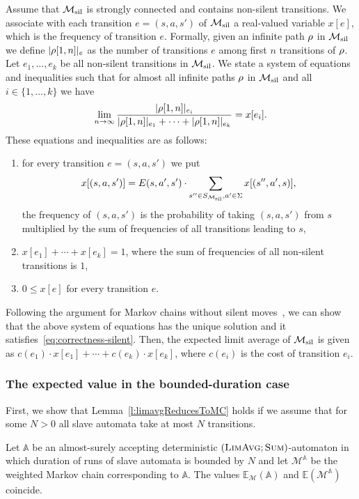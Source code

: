 \documentclass{lmcs}
\newcommand{\nestedA}{\mathbb{A}}
\newcommand{\MCfromNested}{\markov^{\nestedA}}
\newcommand{\fsum}{\textsc{Sum}}
\newcommand{\flimavg}{\textsc{LimAvg}}
\newcommand{\expected}{\mathbb{E}}
\newcommand{\markov}{\mathcal{M}}
\begin{document}
Assume that  $\silentMarkov$ is strongly connected and contains non-silent transitions.
We associate with each transition $e = (s,a,s')$ of $\silentMarkov$ a real-valued variable $x[e]$, which is the frequency of transition $e$.
Formally, given an infinite path $\rho$ in $\silentMarkov$ we define $|\rho[1,n]|_e$ as the number of transitions $e$ among first $n$ transitions of $\rho$.
Let $e_1, \ldots, e_k$ be all non-silent transitions in $\silentMarkov$.
We state a system of equations and inequalities such that for almost all infinite paths $\rho$
in $\silentMarkov$ and all $i \in \{1, \ldots, k\}$ we have
\begin{equation}
\lim_{n \to \infty} \frac{|\rho[1,n]|_{e_i} }{|\rho[1,n]|_{e_1} + \cdots + |\rho[1,n]|_{e_k}} = x[e_i].
\label{eq:correctness-silent}
\end{equation}
These equations and inequalities are as follows:
\begin{enumerate}[label={(E\arabic*)}]
\item\label{E1} for every transition $e = (s,a,s')$ we put
\[
x[(s,a,s')] = E(s,a',s') \cdot \sum_{s'' \in S_{\silentMarkov}, a' \in \Sigma} x[(s'',a',s)],
\]
the frequency of $(s,a,s')$ is the probability of taking $(s,a,s')$ from $s$ multiplied by the sum of frequencies of all transitions leading to $s$,
\item\label{E2} $x[e_1] + \cdots + x[e_k] = 1$, where
the sum of frequencies of all non-silent transitions is $1$,
\item\label{E3} $0 \leq x[e]$ for every transition $e$.
\end{enumerate}

\noindent
Following the argument for Markov chains without silent moves~\cite{filar,BaierBook}, we can show that the above system of equations has the unique solution and it satisfies~\eqref{eq:correctness-silent}.
Then, the expected limit average of $\silentMarkov$ is given as
$c(e_1) \cdot x[e_1] + \cdots + c(e_k) \cdot x[e_k]$, where $c(e_i)$ is the cost of transition $e_i$.

\subsubsection{The expected value in the bounded-duration case}

First, we show that  Lemma~\ref{l:limavgReducesToMC} holds if we assume that for some $N>0$ all slave automata take at most $N$ transitions.

\begin{lem}\label{l:limavgReducesToMC-bounded-width}
Let $\nestedA$ be an almost-surely accepting deterministic $(\flimavg;\fsum)$-automaton
in which duration of runs of slave automata is bounded by $N$
and let $\MCfromNested$ be the weighted Markov chain corresponding to $\nestedA$.
The values $\expected_{\markov}(\nestedA)$  and $\expected(\MCfromNested)$ coincide.
\end{lem}
\end{document}
